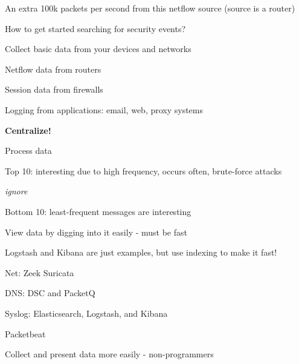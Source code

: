 \documentclass[20pt,landscape,a4paper,footrule]{foils}
\begin{document}




\centerline{An extra 100k packets per second from this netflow source (source is a router)}



\begin{list1}
\item How to get started searching for security events?
\item Collect basic data from your devices and networks
\begin{list2}
\item Netflow data from routers
\item Session data from firewalls
\item Logging from applications: email, web, proxy systems
\end{list2}
\item {\bf Centralize!}
\item Process data
\begin{list2}
\item Top 10: interesting due to high frequency, occurs often, brute-force attacks
\item {\it ignore}
\item Bottom 10: least-frequent messages are interesting
\end{list2}
\end{list1}





\begin{list1}
\item View data by digging into it easily - must be fast
\item Logstash and Kibana are just examples, but use indexing to make it fast!
\end{list1}





\begin{list1}
\item Net: Zeek  Suricata 
\item DNS: DSC and PacketQ 
\item Syslog: Elasticsearch, Logstash, and Kibana
\item Packetbeat 
\end{list1}
\centerline{Collect and present data more easily - non-programmers}
\end{document}
